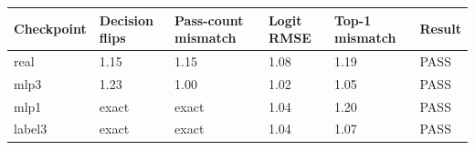 \begin{tabular}{llllll}
\toprule
Checkpoint & Decision flips & Pass-count mismatch & Logit RMSE & Top-1 mismatch & Result \\
\midrule
real & 1.15 & 1.15 & 1.08 & 1.19 & PASS \\
mlp3 & 1.23 & 1.00 & 1.02 & 1.05 & PASS \\
mlp1 & exact & exact & 1.04 & 1.20 & PASS \\
label3 & exact & exact & 1.04 & 1.07 & PASS \\
\bottomrule
\end{tabular}
